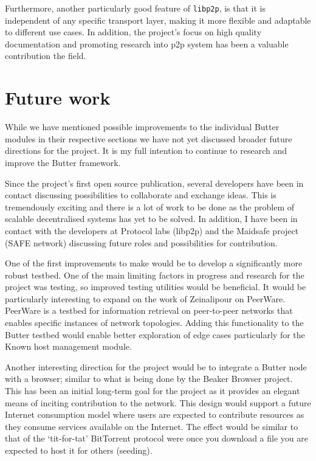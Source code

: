 Furthermore, another particularly good feature of \verb+libp2p+, is that it is independent of any specific transport layer, making it more flexible and adaptable to different use cases. In addition, the project's focus on high quality documentation and promoting research into p2p system has been a valuable contribution the field.



\section{Future work}

While we have mentioned possible improvements to the individual Butter modules in their respective sections we have not yet discussed broader future directions for the project. It is my full intention to continue to research and improve the Butter framework.

Since the project's first open source publication, several developers have been in contact discussing possibilities to collaborate and exchange ideas. This is tremendously exciting and there is a lot of work to be done as the problem of scalable decentralised systems has yet to be solved. In addition, I have been in contact with the developers at Protocol labs (libp2p) and the Maidsafe project (SAFE network) discussing future roles and possibilities for contribution.

One of the first improvements to make would be to develop a significantly more robust testbed. One of the main limiting factors in progress and research for the project was testing, so improved testing utilities would be beneficial. It would be particularly interesting to expand on the work of Zeinalipour on PeerWare\cite{zeinalipour2005peerware}. PeerWare is a testbed for information retrieval on peer-to-peer networks that enables specific instances of network topologies. Adding this functionality to the Butter testbed would enable better exploration of edge cases particularly for the Known host management module.

Another interesting direction for the project would be to integrate a Butter node with a browser; similar to what is being done by the Beaker Browser project\cite{dat2022beaker}. This has been an initial long-term goal for the project as it provides an elegant means of inciting contribution to the network. This design would support a future Internet consumption model where users are expected to contribute resources as they consume services available on the Internet. The effect would be similar to that of the `tit-for-tat' BitTorrent protocol were once you download a file you are expected to host it for others (seeding).


